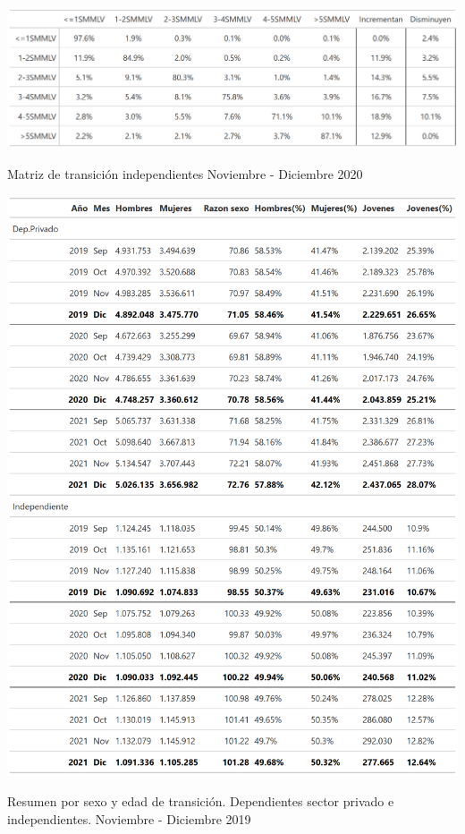 \begin{table}[!h]
\label{tabla:independientes:matrix_transicion_mes_11_12_2020}
\centering
\includegraphics[width = 15cm]{results/02_longitudinal/salida_matriz_transicion_independientes_20.png}
\caption{Matriz de transición independientes Noviembre - Diciembre 2020}%
\end{table}



\begin{table}[!h]
\label{tabla:sector_privado:demograficos}
\centering
\includegraphics[width = 15cm]{results/02_longitudinal/salida_resumen_demog_dependientes_independientes_21.png}
\caption{Resumen por sexo y edad de transición. Dependientes sector privado e independientes. Noviembre - Diciembre 2019}%
\end{table}



